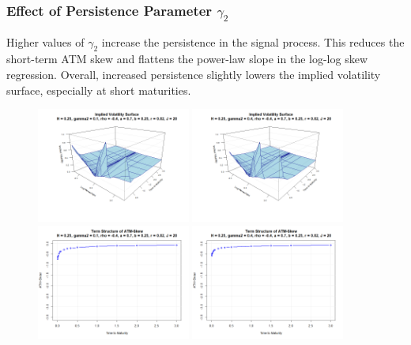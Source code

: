 \subsubsection*{Effect of Persistence Parameter $\gamma_2$}
\begin{minipage}{\textwidth}
Higher values of $\gamma_2$ increase the persistence in the signal process. This reduces the short-term ATM skew and flattens the power-law slope in the log-log skew regression. Overall, increased persistence slightly lowers the implied volatility surface, especially at short maturities.
\begin{figure}[H]
    \centering
    \includegraphics[width=0.45\textwidth]{figures/5.2 Individual Parameter Effects/gamma2=0.10_iv_surface.png}
	\includegraphics[width=0.45\textwidth]{figures/5.2 Individual Parameter Effects/gamma2=0.40_iv_surface.png}
	\includegraphics[width=0.45\textwidth]{figures/5.2 Individual Parameter Effects/gamma2=0.10_atm_skew.png}
	\includegraphics[width=0.45\textwidth]{figures/5.2 Individual Parameter Effects/gamma2=0.40_atm_skew.png}

\end{figure}
\end{minipage}
